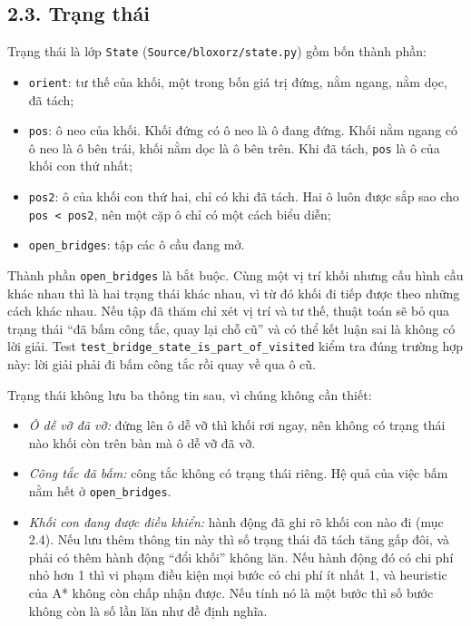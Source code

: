 \subsection{2.3. Trạng thái}

Trạng thái là lớp \texttt{State} (\texttt{Source/\allowbreak{}bloxorz/\allowbreak{}state.\allowbreak{}py}) gồm bốn thành phần:

\begin{itemize}
\tightlist
\item
  \texttt{orient}: tư thế của khối, một trong bốn giá trị đứng, nằm ngang, nằm dọc, đã tách;
\item
  \texttt{pos}: ô neo của khối. Khối đứng có ô neo là ô đang đứng. Khối nằm ngang có ô neo là ô bên trái, khối nằm dọc là ô bên trên. Khi đã tách, \texttt{pos} là ô của khối con thứ nhất;
\item
  \texttt{pos2}: ô của khối con thứ hai, chỉ có khi đã tách. Hai ô luôn được sắp sao cho \texttt{pos < pos2}, nên một cặp ô chỉ có một cách biểu diễn;
\item
  \texttt{open\_\allowbreak{}bridges}: tập các ô cầu đang mở.
\end{itemize}

Thành phần \texttt{open\_\allowbreak{}bridges} là bắt buộc. Cùng một vị trí khối nhưng cấu hình cầu khác nhau thì là hai trạng thái khác nhau, vì từ đó khối đi tiếp được theo những cách khác nhau. Nếu tập đã thăm chỉ xét vị trí và tư thế, thuật toán sẽ bỏ qua trạng thái ``đã bấm công tắc, quay lại chỗ cũ'' và có thể kết luận sai là không có lời giải. Test \texttt{test\_\allowbreak{}bridge\_\allowbreak{}state\_\allowbreak{}is\_\allowbreak{}part\_\allowbreak{}of\_\allowbreak{}visited} kiểm tra đúng trường hợp này: lời giải phải đi bấm công tắc rồi quay về qua ô cũ.

Trạng thái không lưu ba thông tin sau, vì chúng không cần thiết:

\begin{itemize}
\tightlist
\item
  \emph{Ô dễ vỡ đã vỡ:} đứng lên ô dễ vỡ thì khối rơi ngay, nên không có trạng thái nào khối còn trên bàn mà ô dễ vỡ đã vỡ.
\item
  \emph{Công tắc đã bấm:} công tắc không có trạng thái riêng. Hệ quả của việc bấm nằm hết ở \texttt{open\_\allowbreak{}bridges}.
\item
  \emph{Khối con đang được điều khiển:} hành động đã ghi rõ khối con nào đi (mục 2.4). Nếu lưu thêm thông tin này thì số trạng thái đã tách tăng gấp đôi, và phải có thêm hành động ``đổi khối'' không lăn. Nếu hành động đó có chi phí nhỏ hơn 1 thì vi phạm điều kiện mọi bước có chi phí ít nhất 1, và heuristic của A* không còn chấp nhận được. Nếu tính nó là một bước thì số bước không còn là số lần lăn như đề định nghĩa.
\end{itemize}

